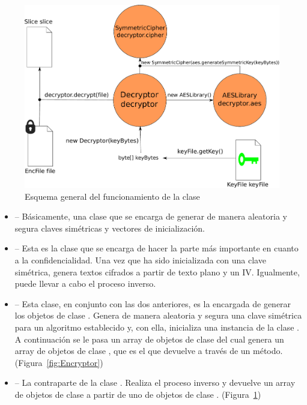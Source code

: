 \begin{figure}[!htb]
  \centering
  \includegraphics[scale=0.5]{Figures/Decryptor}
  \decoRule
  \caption[]{Esquema general del funcionamiento de la clase }
  \label{fig:Decryptor}
\end{figure}

\begin{itemize}
  \item {} -- Básicamente, una clase que se encarga de generar de manera aleatoria y segura claves simétricas y vectores de inicialización.

  \item {} -- Esta es la clase que se encarga de hacer la parte más importante en cuanto a la confidencialidad. Una vez que ha sido inicializada con una clave simétrica, genera textos cifrados a partir de texto plano y un IV. Igualmente, puede llevar a cabo el proceso inverso.

  \item {} -- Esta clase, en conjunto con las dos anteriores, es la encargada de generar los objetos de clase . Genera de manera aleatoria y segura una clave simétrica para un algoritmo establecido y, con ella, inicializa una instancia de la clase . A continuación se le pasa un array de objetos de clase  del cual genera un array de objetos de clase , que es el que devuelve a través de un método. (Figura~\ref{fig:Encryptor})

  \item {} -- La contraparte de la clase . Realiza el proceso inverso y devuelve un array de objetos de clase  a partir de uno de objetos de clase . (Figura~\ref{fig:Decryptor})
\end{itemize}

